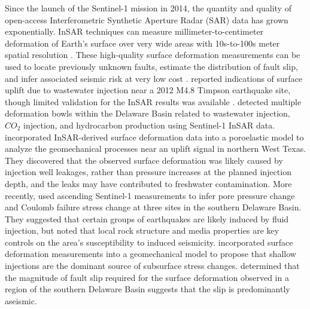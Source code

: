 Since the launch of the Sentinel-1 mission in 2014, the quantity and quality of open-access Interferometric Synthetic Aperture Radar (SAR) data has grown exponentially. InSAR techniques can measure millimeter-to-centimeter deformation of Earth's surface over very wide areas with 10s-to-100s meter spatial resolution \citep{Massonnet1993DisplacementFieldLanders, Buergmann2000SyntheticApertureRadar}. These high-quality surface deformation measurements can be used to locate previously unknown faults, estimate the distribution of fault slip, and infer associated seismic risk at very low cost \citep{Segall2010EarthquakeVolcanoDeformation, Elliott2016RoleSpaceBased, Huang2017FaultGeometryInversion}. \cite{Shirzaei2016SurfaceUpliftTime} reported indications of surface uplift due to wastewater injection near a 2012 M4.8 Timpson earthquake site, though limited validation for the InSAR results was available \citep{Semple2017IncompleteInventorySuspected}.
\cite{Kim2018AssociationLocalizedGeohazards} detected multiple deformation bowls within the Delaware Basin related to wastewater injection, $CO_2$ injection, and hydrocarbon production using Sentinel-1 InSAR data. \cite{Zheng2019WastewaterLeakageWest} incorporated InSAR-derived surface deformation data into a poroelastic model to analyze the geomechanical processes near an uplift signal in northern West Texas. They discovered that the observed surface deformation was likely caused by injection well leakages, rather than pressure increases at the planned injection depth, and the leaks may have contributed to freshwater contamination. More recently, \cite{Deng2020SurfaceDeformationInduced} used ascending Sentinel-1 measurements to infer pore pressure change and Coulomb failure stress change at three sites in the southern Delaware Basin. They suggested that certain groups of earthquakes are likely induced by fluid injection, but noted that local rock structure and media properties are key controls on the area's susceptibility to induced seismicity.
\cite{Zhai2021WidespreadDeepSeismicity} incorporated surface deformation measurements into a geomechanical model to propose that shallow injections are the dominant source of subsurface stress changes. \cite{Pepin2022ShallowAseismicSlip} determined that the magnitude of fault slip required for the surface deformation observed in a region of the southern Delaware Basin suggests that the slip is predominantly aseismic.


